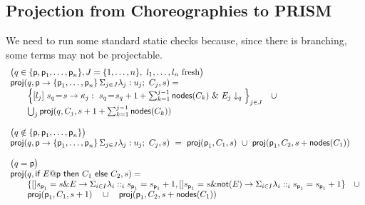 \subsection{Projection from Choreographies to PRISM}
 We need to run some standard
static checks because, since there is branching, some terms may not be
projectable.
%
\begin{displaymath}
  \begin{array}{lllll}
    \big(q\in\{\textsf{p}, \textsf{p}_1,\ldots,\textsf{p}_n\}, J=\{1,\ldots,n\},\ l_1,\ldots, l_n \text{ fresh}  
    \big)\\
    \mathsf{proj} (q,\textsf{p}\rightarrow \{\textsf{p}_1,\ldots,\textsf{p}_n\}\,\Sigma_{j\in J} \lambda_j: u_j;\ C_j, s)= \\
    \qquad
    \Big\{[l_j] \ s_{q}\!=\! s \rightarrow \kappa_j:\ s_{q}\!=\!
    s_{q} +1+\sum_{k=1}^{j-1}\mathsf{nodes}({C_k})\ \&\ E_j\downarrow_q\Big\}_{j\in J}
    \quad\cup\\
    \qquad\bigcup_{j} \mathsf{proj} (q, C_j, s+1+\sum_{k=1}^{j-1}\mathsf{nodes}({C_k}))
    \\\\
    \big(q\notin\{\textsf{p}, \textsf{p}_1,\ldots,\textsf{p}_n\}\big)\\
    \mathsf{proj} (q,\textsf{p}\rightarrow \{\textsf{p}_1,\ldots,\textsf{p}_n\}\,\Sigma_{j\in J} \lambda_j: u_j;\ C_j, s)\ = \ \mathsf{proj} (\textsf{p}_1, C_1, s)
    \ \cup\
    \mathsf{proj} (\textsf{p}_1, C_2, s+\mathsf{nodes}(C_1))
    \\\\
    \big(q = \textsf{p}\big)\\
    \mathsf{proj} (q,\textsf{if } E@\textsf{p} \textsf{ then } {C_1} \textsf{ else } {C_2}, s)= \\
    \qquad\{ 
    [] s_{\textsf{p}_1} = s \& E \rightarrow \Sigma_{i\in I}\lambda_i: :_i s_{\textsf{p}_1} = s_{\textsf{p}_1} +1,  
    [] s_{\textsf{p}_1} = s \& \mathsf{not}(E) \rightarrow \Sigma_{i\in I}\lambda_i: :_i s_{\textsf{p}_1} = s_{\textsf{p}_1} +1  
    \}
    \quad\cup\\
    \qquad \mathsf{proj} (\textsf{p}_1, C_1, s+1)
    \quad\cup\quad
    \mathsf{proj} (\textsf{p}_1, C_2, s+\mathsf{nodes}(C_1))
  \end{array}
\end{displaymath}


       






